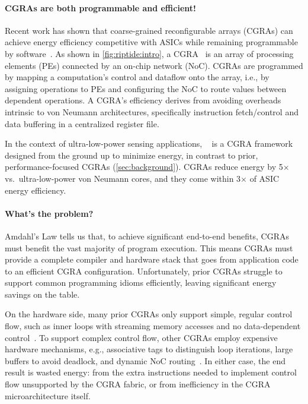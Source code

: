\paragraph{CGRAs are both programmable and efficient!}
%
Recent work has shown that coarse-grained reconfigurable
arrays (CGRAs) can achieve energy efficiency competitive with ASICs
while remaining programmable by software~\cite{snafu,nowatzki2017domain,weng2020dsagen}.
%
As shown in \autoref{fig:riptide:intro},
a CGRA~\cite{remarc,adres,matrix,dyser,revamp,opencgra,cgrame,wave,nguyen2021fifer,morphosys,mozart,ppa,fpca,plasticine,dadu2019towards,parashar2013triggered,capstan,nowatzki:isca17:stream-dataflow,goldstein2000piperench,trips,weng2020dsagen,weng2020hybrid,voitsechov2014single,mishra2006tartan,tan2018stitch,karunaratne2017hycube,voitsechov2018inter,evx} is an array of processing elements
(PEs) connected by an on-chip network (NoC).
%
CGRAs are programmed by mapping a computation's control and dataflow
onto the array, i.e., by assigning operations to PEs and configuring
the NoC to route values between dependent operations.
%
A CGRA's efficiency derives from avoiding overheads intrinsic to von
Neumann architectures, specifically instruction fetch/control and data
buffering in a centralized register file.

In the context of ultra-low-power sensing applications,
\snafu~\cite{snafu} is a CGRA framework designed from
the ground up to minimize energy, in contrast to prior,
performance-focused CGRAs (\autoref{sec:background}).
%
\snafu CGRAs reduce energy by 5$\times$ vs.\ ultra-low-power von Neumann
cores, and they come within 3$\times$ of ASIC energy efficiency.

\figRipTideIntro

\paragraph{What's the problem?}
%
Amdahl's Law tells us that, to achieve significant end-to-end benefits,
CGRAs must benefit the vast majority of program execution.
%
This means CGRAs must provide a complete compiler and hardware stack
that goes from application code to an efficient CGRA configuration.
%
Unfortunately, prior CGRAs struggle to support common programming
idioms efficiently, leaving significant energy savings on the table.

On the hardware side,
%
many prior CGRAs only support simple, regular control flow,
such as inner loops with streaming memory accesses
and no data-dependent control~\cite{plasticine,nowatzki:isca17:stream-dataflow,snafu}.
%
To support complex control flow, other CGRAs employ expensive hardware mechanisms, e.g.,
associative tags to distinguish loop iterations,
large buffers to avoid deadlock,
and dynamic NoC routing~\cite{monsoon,ttda,swanson2003wavescalar,voitsechov2014single}.
%
In either case, the end result is wasted energy:
%
from the extra instructions needed to implement control flow unsupported
by the CGRA fabric,
%
or from inefficiency in the CGRA microarchitecture itself.

